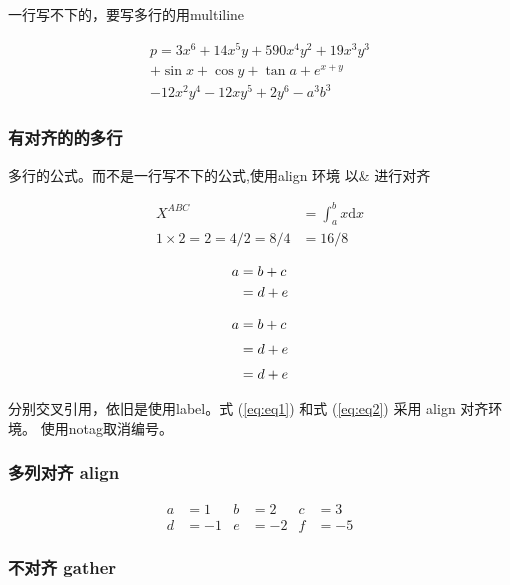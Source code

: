 \documentclass[utf-8,a4paper,11pt]{article}
\begin{document}
一行写不下的，要写多行的用multiline
\begin{LTXexample}
    \begin{multline}
        p = 3x^6 + 14x^5y + 590x^4y^2 + 19x^3y^3\\
        + \sin{x} + \cos{y} + \tan{a} + e^{x+y} \\
        - 12x^2y^4 - 12xy^5 + 2y^6 - a^3b^3
    \end{multline}
\end{LTXexample}

\subsubsection{有对齐的的多行}

多行的公式。而不是一行写不下的公式,使用align 环境 以\& 进行对齐
\begin{LTXexample}
\begin{align*}
    X^{ABC}& = \int_a^b x \mathrm{d}x \\
    1\times 2=2=4/2=8/4 & =16/8
\end{align*}

\begin{align}
    a & = b + c\\
      & = d + e \notag
\end{align}
\end{LTXexample}

\begin{align}
    a & = b + c \label{eq:eq1}
    \\[3pt]
      & = d + e  \label{eq:eq2}
    \\[3pt]
      & = d + e \notag
\end{align}

分别交叉引用，依旧是使用label。式 (\ref{eq:eq1}) 和式 (\ref{eq:eq2}) 采用 align 对齐环境。 使用notag取消编号。

\subsubsection{多列对齐 align}

\begin{LTXexample}
\begin{align*} 
  a &=1 & b &=2 & c &=3 \\ 
  d &=-1 & e &=-2 & f &=-5 
\end{align*}
\end{LTXexample}


\subsubsection{不对齐 gather}
\end{document}
